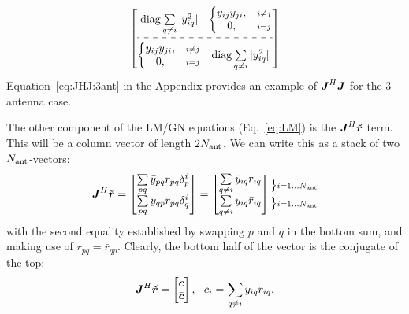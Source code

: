\documentclass[useAMS,usenatbib]{mn2e}
\makeatletter
\newcommand{\mat}[1]{{\bmath{#1}}}
\newcommand{\JJ}{\mat{J}} %
\newcommand{\Matrix}[2]{\left [ \begin{array}{@{}#1@{}}#2\end{array} \right ]}
\newcommand{\Stack}[1]{\begin{array}{@{}c@{}}#1\end{array}}
\newcommand{\AUG}[1]{\bmath{\breve{#1}}}
\newcommand{\Rr}{\AUG{r}}
\numberwithin{equation}{section}
\providecommand{\DIFaddbegin}{} %
\providecommand{\DIFaddend}{} %
\providecommand{\DIFdelend}{} %
\makeatother
\begin{document}
\begin{equation}%
\DIFdelend \DIFaddbegin \JHJblocksFull{
\mathrm{diag} \sum\limits_{q\ne i} |y_{iq}^2| 
}{
  \left \{ 
  \begin{array}{@{}cc@{}}
   \bar{y}_{ij} \bar{y}_{ji}, &{\scriptstyle i\ne j} \\
   0, &{\scriptstyle i=j}
  \end{array} \right .
}{
  \left \{ 
  \begin{array}{@{}cc@{}}
   y_{ij}y_{ji},&{\scriptstyle i\ne j} \\
   0, &{\scriptstyle i=j}
  \end{array} \right . 
}{
  \mathrm{diag} \sum\limits_{q\ne i} |y^2_{iq}| 
}
\end{equation}
Equation~\ref{eq:JHJ:3ant} in the Appendix provides an example of $\JJ^H\JJ$ for the 3-antenna case. 

\newcommand{\yysq}[2]{{y^2_{#1}+y^2_{#2}}}
\newcommand{\bb}[2]{{\bar{y}_{#1#2}\bar{y}_{#2#1}}}
\newcommand{\bbb}[2]{y_{#1#2}y_{#2#1}}

The other component of the LM/GN equations (Eq.~\ref{eq:LM}) is the $\JJ^H\Rr$ term. This will be a column vector of length $2N_\mathrm{ant}$. We can write this as a stack of two $N_\mathrm{ant}$-vectors:
\begin{equation}
\label{eq:JHR:DI}
\JJ^H\Rr = \Matrix{c}{ 
\sum\limits_{pq} \bar{y}_{pq} r_{pq} \delta^{i}_p  \\
\sum\limits_{pq} y_{qp} r_{pq} \delta^{i}_q 
} = \Matrix{c}{
\sum\limits_{q\ne i} \bar{y}_{iq} r_{iq}   \\
\sum\limits_{q\ne i} y_{iq} \bar{r}_{iq}  
}
\Stack{
\bm{\big\}} \scriptstyle i=1\dots \Na \\[1ex] 
\bm{\big\}} \scriptstyle i=1\dots \Na
}
\DIFaddend \end{equation}
with the second equality established by swapping $p$ and $q$ in the bottom sum, and making use of $r_{pq}=\bar{r}_{qp}$. Clearly, the bottom half of the vector is the conjugate of the top:
\begin{equation}
\label{eq:JHR:DI1}
\JJ^H\Rr = \Matrix{c}{\bmath{c}\\\bar{\bmath{c}}},~~c_i = \sum\limits_{q\ne i} \bar{y}_{iq} r_{iq}.
\end{equation}
\end{document}
